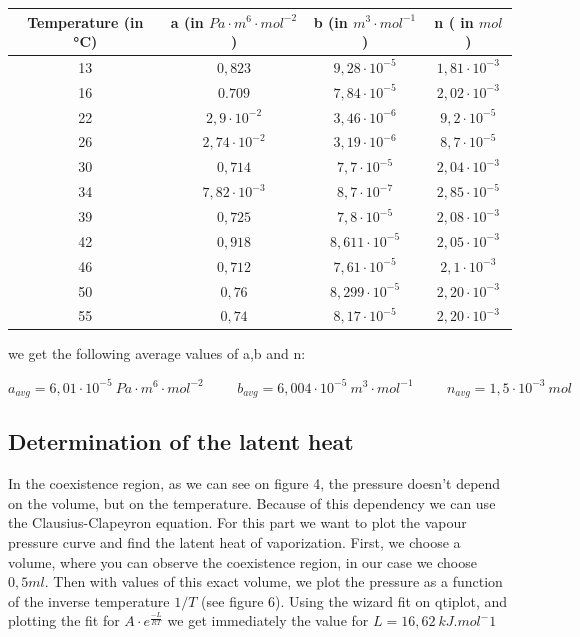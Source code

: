 \documentclass{scrartcl}
\begin{document}
\medskip
\centering
\begin{tabular}{|c|c|c|c|}
    \hline
     Temperature (in °C) & a (in $Pa \cdot m^6 \cdot mol^{-2}$) & b (in  $m^3 \cdot mol^{-1}$) & n ( in $mol$) \\
     \hline
     13 & $ 0,823 $ &$ 9,28 \cdot 10^{-5} $ & $ 1,81 \cdot10^{-3} $ \\
     \hline
     16 & $ 0.709 $ & $ 7,84 \cdot 10^{-5} $ & $ 2,02 \cdot 10^{-3} $  \\
     \hline
     22 & $ 2,9 \cdot 10^{-2}$ & $ 3,46 \cdot 10^{-6}$ & $ 9,2 \cdot 10^{-5} $ \\
     \hline
     26 & $ 2,74 \cdot 10^{-2}$ & $ 3,19 \cdot 10^{-6}$ & $8,7 \cdot 10^{-5} $\\
     \hline
     30 & $ 0,714 $ & $ 7,7 \cdot 10^{-5} $ & $ 2,04 \cdot10^{-3} $ \\
     \hline
     34 & $ 7,82 \cdot 10^{-3} $ & $ 8,7 \cdot 10^{-7} $ & $ 2,85 \cdot 10^{-5}$ \\
     \hline
     39 & $ 0,725 $ & $ 7,8 \cdot 10^{-5} $ & $ 2,08 \cdot 10^{-3} $\\
     \hline
     42 & $ 0,918 $ & $ 8,611 \cdot 10^{-5} $ & $ 2,05 \cdot 10^{-3} $\\
     \hline
     46 & $ 0,712 $ & $ 7,61 \cdot 10^{-5} $ & $ 2,1 \cdot 10^{-3}$\\
     \hline
     50 & $ 0,76 $ & $ 8,299 \cdot 10^{-5} $ & $ 2,20\cdot 10^{-3} $\\
     \hline
     55 & $ 0,74 $ & $ 8,17 \cdot 10^{-5} $ & $ 2,20 \cdot10^{-3} $ \\
     \hline
\end{tabular}
\flushleft
we get the following average values of a,b and n:

\begin{equation}
    \boxed{a_{avg} = 6,01 \cdot 10^{-5} \ Pa \cdot m^6 \cdot mol^{-2}} \hspace{1cm}
    \boxed{b_{avg}=6,004 \cdot 10^{-5} \ m^3 \cdot mol^{-1}} \hspace{1cm} \boxed{n_{avg}= 1,5 \cdot 10^{-3} \ mol } \nonumber
\end{equation}

\subsection{Determination of the latent heat }

In the coexistence region, as we can see on figure 4, the pressure doesn't depend on the volume, but on the temperature. Because of this dependency we can use the Clausius-Clapeyron equation. For this part we want to plot the vapour pressure curve and find the latent heat of vaporization. 
First, we choose a volume, where you can observe the coexistence region, in our case we choose $0,5 ml$. Then with values of this exact volume, we plot the pressure as a function of the inverse temperature $1/T$ (see figure 6). Using the wizard fit on qtiplot, and plotting the fit for $A \cdot e^{\frac{-L}{RT}}$ we get immediately the value for $\boxed {L= 16,62 \ kJ.mol^-1}$
\end{document}
